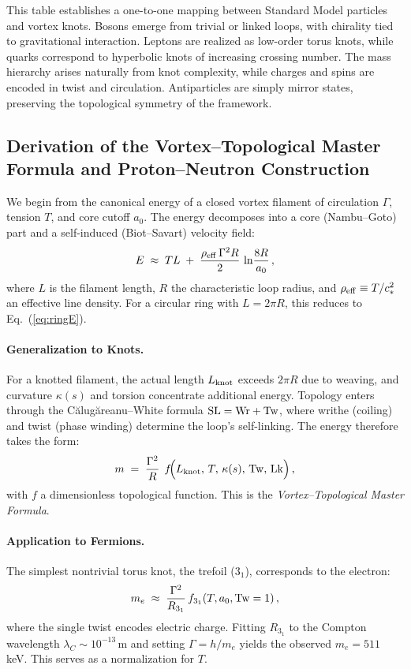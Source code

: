 \documentclass[12pt]{article}
\begin{document}
{{This table establishes a one-to-one mapping between Standard Model particles and vortex knots.
Bosons emerge from trivial or linked loops, with chirality tied to gravitational interaction.
Leptons are realized as low-order torus knots, while quarks correspond to hyperbolic knots of increasing crossing number.
The mass hierarchy arises naturally from knot complexity, while charges and spins are encoded in twist and circulation.
Antiparticles are simply mirror states, preserving the topological symmetry of the framework.

\subsection{Derivation of the Vortex--Topological Master Formula and Proton--Neutron Construction}

We begin from the canonical energy of a closed vortex filament of circulation $\Gamma$, tension $T$, and core cutoff $a_0$. The energy decomposes into a core (Nambu–Goto) part and a self-induced (Biot–Savart) velocity field:
\begin{equation}
E \;\approx\; T L \;+\; \frac{\rho_{\rm eff}\,\Gamma^2 R}{2}\,\ln\!\frac{8R}{a_0}\,,
\label{eq:ringE}
\end{equation}
where $L$ is the filament length, $R$ the characteristic loop radius, and $\rho_{\rm eff}\equiv T/c_*^2$ an effective line density. For a circular ring with $L=2\pi R$, this reduces to Eq.~(\ref{eq:ringE}).

\paragraph{Generalization to Knots.}
For a knotted filament, the actual length $L_{\rm knot}$ exceeds $2\pi R$ due to weaving, and curvature $\kappa(s)$ and torsion concentrate additional energy. Topology enters through the Călugăreanu–White formula ${\rm SL}={\rm Wr}+{\rm Tw}$, where writhe (coiling) and twist (phase winding) determine the loop’s self-linking. The energy therefore takes the form:
\begin{equation}
m \;=\; \frac{\Gamma^2}{R}\;\,f\!\Big(L_{\rm knot},\,T,\,\kappa(s),\,{\rm Tw},\,{\rm Lk}\Big)\,,
\label{eq:master}
\end{equation}
with $f$ a dimensionless topological function. This is the \emph{Vortex–Topological Master Formula}.

\paragraph{Application to Fermions.}
The simplest nontrivial torus knot, the trefoil ($3_1$), corresponds to the electron:
\begin{equation}
m_e \;\approx\; \frac{\Gamma^2}{R_{3_1}}\,f_{3_1}(T,a_0,{\rm Tw}=1)\,,
\end{equation}
where the single twist encodes electric charge. Fitting $R_{3_1}$ to the Compton wavelength $\lambda_C\sim 10^{-13}\,$m and setting $\Gamma = h/m_e$ yields the observed $m_e=511$ keV. This serves as a normalization for $T$.

}}
\end{document}

